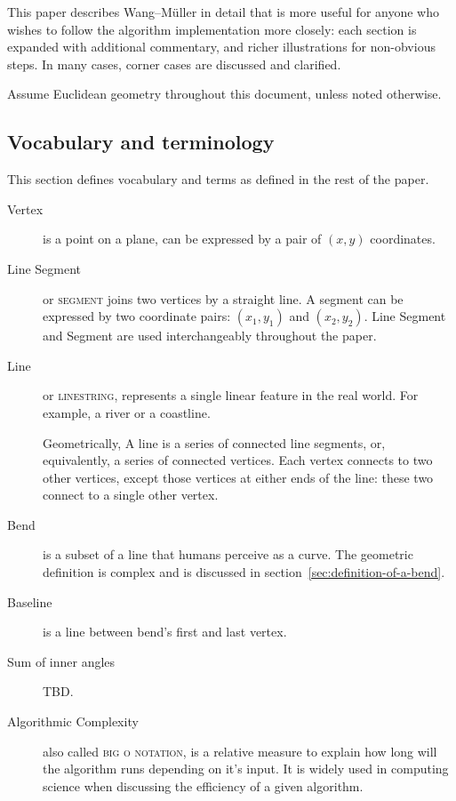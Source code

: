 \documentclass[a4paper]{article}
\newcommand{\WM}{Wang--M{\"u}ller}
\begin{document}
This paper describes {\WM} in detail that is more useful for anyone who wishes
to follow the algorithm implementation more closely: each section is expanded
with additional commentary, and richer illustrations for non-obvious steps. In
many cases, corner cases are discussed and clarified.

Assume Euclidean geometry throughout this document, unless noted otherwise.

\subsection{Vocabulary and terminology}
\label{sec:vocab}

This section defines vocabulary and terms as defined in the rest of the paper.

\begin{description}

    \item[Vertex] is a point on a plane, can be expressed by a pair of $(x,y)$
        coordinates.

    \item[Line Segment] or \textsc{segment} joins two vertices by a straight
        line. A segment can be expressed by two coordinate pairs: $(x_1, y_1)$
        and $(x_2, y_2)$. Line Segment and Segment are used interchangeably
        throughout the paper.

    \item[Line] or \textsc{linestring}, represents a single linear feature in
        the real world. For example, a river or a coastline.

        Geometrically, A line is a series of connected line segments, or,
        equivalently, a series of connected vertices. Each vertex connects to
        two other vertices, except those vertices at either ends of the line:
        these two connect to a single other vertex.

    \item[Bend] is a subset of a line that humans perceive as a curve. The
        geometric definition is complex and is discussed in
        section~\ref{sec:definition-of-a-bend}.

    \item[Baseline] is a line between bend's first and last vertex.

    \item[Sum of inner angles] TBD.

    \item[Algorithmic Complexity] also called \textsc{big o notation}, is a
        relative measure to explain how long will the algorithm runs depending
        on it's input. It is widely used in computing science when discussing
        the efficiency of a given algorithm.


\end{description}
\end{document}
